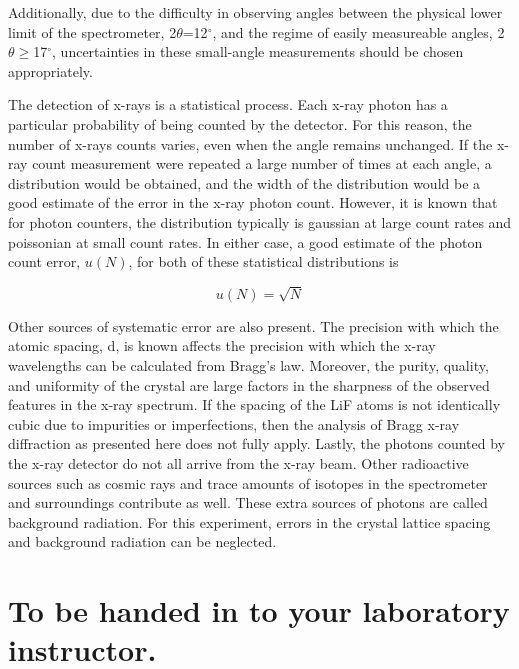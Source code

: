Additionally, due to the difficulty in observing angles between the physical lower limit of the spectrometer, 2$\theta$=12$^{\circ}$, and the regime of easily measureable angles, 2$\theta\geq$17$^{\circ}$, uncertainties in these small-angle measurements should be chosen appropriately.

The detection of x-rays is a statistical process. Each x-ray photon has a particular probability of being counted by the detector. For this reason, the number of x-rays counts varies, even when the angle remains unchanged. If the x-ray count measurement were repeated a large number of times at each angle, a distribution would be obtained, and the width of the distribution would be a good estimate of the error in the x-ray photon count. However, it is known that for photon counters, the distribution typically is gaussian at large count rates and poissonian at small count rates. In either case, a good estimate of the photon count error, $u(N)$, for both of these statistical distributions is

\begin{equation}
u(N)=\sqrt{N}
\label{equ:xr8}
\end{equation}

Other sources of systematic error are also present. The precision with which the atomic spacing, d, is known affects the precision with which the x-ray wavelengths can be calculated from Bragg's law. Moreover, the purity, quality, and uniformity of the crystal are large factors in the sharpness of the observed features in the x-ray spectrum. If the spacing of the LiF atoms is not identically cubic due to impurities or imperfections, then the analysis of Bragg x-ray diffraction as presented here does not fully apply. Lastly, the photons counted by the x-ray detector do not all arrive from the x-ray beam. Other radioactive sources such as cosmic rays and trace amounts of isotopes in the spectrometer and surroundings contribute as well. These extra sources of photons are called background radiation. For this experiment, errors in the crystal lattice spacing and background radiation can be neglected.

\section{To be handed in to your laboratory instructor.}


